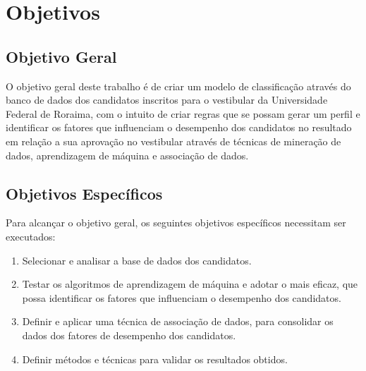 \section{Objetivos}

\subsection{Objetivo Geral}

O objetivo geral deste trabalho é de criar um modelo de classificação através do banco de dados dos candidatos inscritos para o vestibular da Universidade Federal de Roraima, com o intuito de criar regras que se possam gerar um perfil e identificar os fatores que influenciam o desempenho dos candidatos no resultado em relação a sua aprovação no vestibular através de técnicas de mineração de dados, aprendizagem de máquina e associação de dados.


\subsection{Objetivos Específicos}

Para alcançar o objetivo geral, os seguintes objetivos específicos necessitam ser executados:


\begin{enumerate}
  \item Selecionar e analisar a base de dados dos candidatos.
  \item Testar os algoritmos de aprendizagem de máquina e adotar o mais eficaz, que possa identificar os fatores que influenciam o desempenho dos candidatos.
  \item Definir e aplicar uma técnica de associação de dados, para consolidar os dados dos fatores de desempenho dos candidatos.
  \item Definir métodos e técnicas para validar os resultados obtidos.
\end{enumerate}



